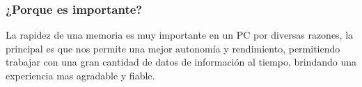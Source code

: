 \documentclass{article}
\begin{document}
\subsubsection{¿Porque es importante?}
La rapidez de una memoria es muy importante en un PC por diversas razones, la principal es que nos permite una mejor autonomía y rendimiento, permitiendo trabajar con una gran cantidad de datos de información al tiempo, brindando una experiencia mas agradable y fiable.


\newpage



\end{document}
